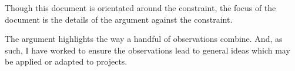 \begin{note}
  Though this document is orientated around the constraint, the focus of the document is the details of the argument against the constraint.

  The argument highlights the way a handful of observations combine.
  And, as such, I have worked to ensure the observations lead to general ideas which may be applied or adapted to projects.
\end{note}



